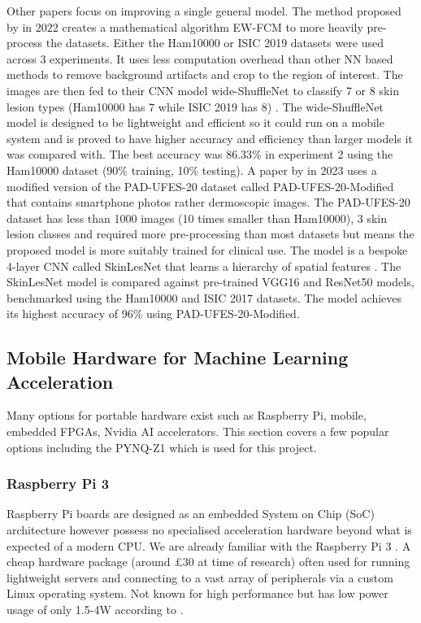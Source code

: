 \documentclass[12pt,nonacm,acmlarge,titlepage,screen]{acmart}
\begin{document}
		\smallskip\noindent
		Other papers focus on improving a single general model. The method proposed by \citet{wide_shufflenet_2022} in 2022 creates a mathematical algorithm EW-FCM to more heavily pre-process the datasets. Either the Ham10000 or ISIC 2019 datasets were used across 3 experiments. It uses less computation overhead than other NN based methods to remove background artifacts and crop to the region of interest. The images are then fed to their CNN model wide-ShuffleNet to classify 7 or 8 skin lesion types (Ham10000 has 7 while ISIC 2019 has 8) \cite{wide_shufflenet_2022}. The wide-ShuffleNet model is designed to be lightweight and efficient so it could run on a mobile system and is proved to have higher accuracy and efficiency than larger models it was compared with. The best accuracy was 86.33\% in experiment 2 using the Ham10000 dataset (90\% training, 10\% testing). A paper by \citet{skinlesnet_2023} in 2023 uses a modified version of the PAD-UFES-20 dataset \cite{padufes20} called PAD-UFES-20-Modified that contains smartphone photos rather dermoscopic images. The PAD-UFES-20 dataset has less than 1000 images (10 times smaller than Ham10000), 3 skin lesion classes and required more pre-processing than most datasets but means the proposed model is more suitably trained for clinical use. The model is a bespoke 4-layer CNN called SkinLesNet that learns a hierarchy of spatial features \cite{skinlesnet_2023}. The SkinLesNet model is compared against pre-trained VGG16 and ResNet50 models, benchmarked using the Ham10000 and ISIC 2017 datasets. The model achieves its highest accuracy of 96\% using PAD-UFES-20-Modified.

	\subsection{Mobile Hardware for Machine Learning Acceleration} \label{lit:hardware}
	Many options for portable hardware exist such as Raspberry Pi, mobile, embedded FPGAs, Nvidia AI accelerators. This section covers a few popular options including the PYNQ-Z1 which is used for this project.
	
		\subsubsection{Raspberry Pi 3}
		Raspberry Pi boards are designed as an embedded System on Chip (SoC) architecture however possess no specialised acceleration hardware beyond what is expected of a modern CPU. We are already familiar with the Raspberry Pi 3 \cite{pi3_product_page}. A cheap hardware package (around £30 at time of research) often used for running lightweight servers and connecting to a vast array of peripherals via a custom Linux operating system. Not known for high performance but has low power usage of only 1.5-4W according to \cite{tess_pi}. %
\end{document}
